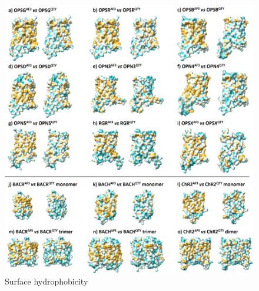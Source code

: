 \documentclass[fleqn,10pt,lineno]{manuscript}
\begin{document}
\begin{figure}[h]
	\centering
	\includegraphics[width=\linewidth]{figures/hydrophobicity.jpg}
	\caption{Surface hydrophobicity}
	\label{fig:hydrophobicity}
\end{figure}
\end{document}
